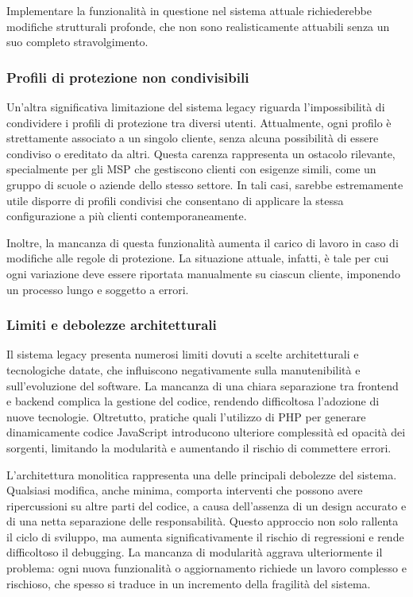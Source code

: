Implementare la funzionalità in questione nel sistema attuale richiederebbe modifiche strutturali profonde, che non sono realisticamente attuabili senza un suo completo stravolgimento.

\subsubsection{Profili di protezione non condivisibili}
Un’altra significativa limitazione del sistema legacy riguarda l’impossibilità di condividere i profili di protezione tra diversi utenti. Attualmente, ogni profilo è strettamente associato a un singolo cliente, senza alcuna possibilità di essere condiviso o ereditato da altri. Questa carenza rappresenta un ostacolo rilevante, specialmente per gli MSP che gestiscono clienti con esigenze simili, come un gruppo di scuole o aziende dello stesso settore. In tali casi, sarebbe estremamente utile disporre di profili condivisi che consentano di applicare la stessa configurazione a più clienti contemporaneamente.

Inoltre, la mancanza di questa funzionalità aumenta il carico di lavoro in caso di modifiche alle regole di protezione. La situazione attuale, infatti, è tale per cui ogni variazione deve essere riportata manualmente su ciascun cliente, imponendo un processo lungo e soggetto a errori.

\subsubsection{Limiti e debolezze architetturali}
Il sistema legacy presenta numerosi limiti dovuti a scelte architetturali e tecnologiche datate, che influiscono negativamente sulla manutenibilità e sull'evoluzione del software. La mancanza di una chiara separazione tra frontend e backend complica la gestione del codice, rendendo difficoltosa l’adozione di nuove tecnologie. Oltretutto, pratiche quali l’utilizzo di PHP per generare dinamicamente codice JavaScript introducono ulteriore complessità ed opacità dei sorgenti, limitando la modularità e aumentando il rischio di commettere errori.

L’architettura monolitica rappresenta una delle principali debolezze del sistema. Qualsiasi modifica, anche minima, comporta interventi che possono avere ripercussioni su altre parti del codice, a causa dell’assenza di un design accurato e di una netta separazione delle responsabilità. Questo approccio non solo rallenta il ciclo di sviluppo, ma aumenta significativamente il rischio di regressioni e rende difficoltoso il debugging. La mancanza di modularità aggrava ulteriormente il problema: ogni nuova funzionalità o aggiornamento richiede un lavoro complesso e rischioso, che spesso si traduce in un incremento della fragilità del sistema.

